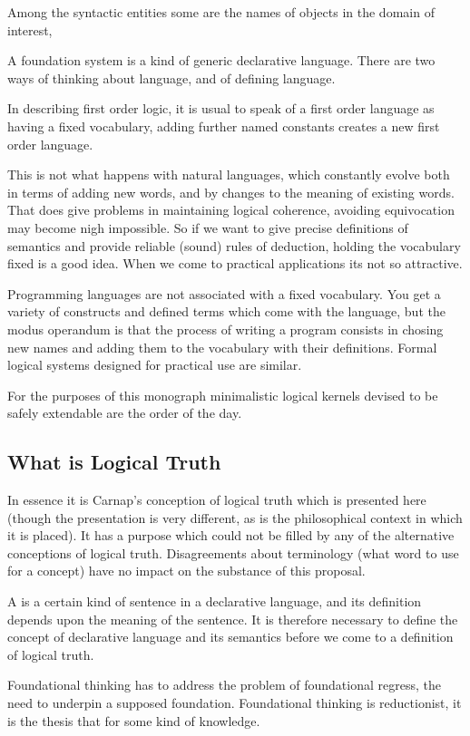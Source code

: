 Among the syntactic entities some are the names of objects in the domain of interest, 


A foundation system is a kind of generic declarative language.
There are two ways of thinking about language, and of defining language.

In describing first order logic, it is usual to speak of a first order language as having a fixed vocabulary, adding further named constants creates a new first order language.

This is not what happens with natural languages, which constantly evolve both in terms of adding new words, and by changes to the meaning of existing words.
That does give problems in maintaining logical coherence, avoiding equivocation may become nigh impossible.
So if we want to give precise definitions of semantics and provide reliable (sound) rules of deduction, holding the vocabulary fixed is a good idea.
When we come to practical applications its not so attractive.

Programming languages are not associated with a fixed vocabulary.
You get a variety of constructs and defined terms which come with the language, but the modus operandum is that the process of writing a program consists in chosing new names and adding them to the vocabulary with their definitions.
Formal logical systems designed for practical use are similar.

For the purposes of this monograph minimalistic logical kernels devised to be safely extendable are the order of the day.

\subsection{What is Logical Truth}


In essence it is Carnap's conception of logical truth which is presented here %
(though the presentation is very different, as is the philosophical context in which it is placed).
It has a purpose which could not be filled by any of the alternative conceptions of logical truth.
Disagreements about terminology (what word to use for a concept)  have no impact on the substance of this proposal.

A  is a certain kind of sentence in a declarative language, and its definition depends upon the meaning of the sentence.
It is therefore necessary to define the concept of declarative language and its semantics before we come to a definition of logical truth.





Foundational thinking has to address the problem of foundational regress, the need to underpin a supposed foundation.
Foundational thinking is reductionist, it is the thesis that for some kind of knowledge.
